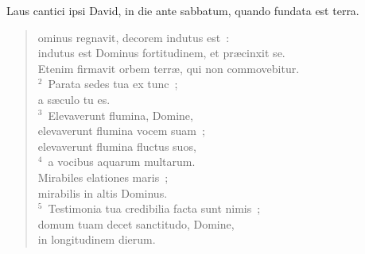 \bchapter[Psalm]
Laus cantici ipsi David, in die ante sabbatum, quando fundata est terra. \begin{verse}ominus regnavit, decorem indutus est~:\\ indutus est Dominus fortitudinem, et pr\ae cinxit se.\\ Etenim firmavit orbem terr\ae , qui non commovebitur.\\
${}^{2}$~Parata sedes tua ex tunc~;\\ a s\ae culo tu es.\\
${}^{3}$~Elevaverunt flumina, Domine,\\ elevaverunt flumina vocem suam~;\\ elevaverunt flumina fluctus suos,\\
${}^{4}$~a vocibus aquarum multarum.\\ Mirabiles elationes maris~;\\ mirabilis in altis Dominus.\\
${}^{5}$~Testimonia tua credibilia facta sunt nimis~;\\ domum tuam decet sanctitudo, Domine,\\ in longitudinem dierum.\end{verse}



